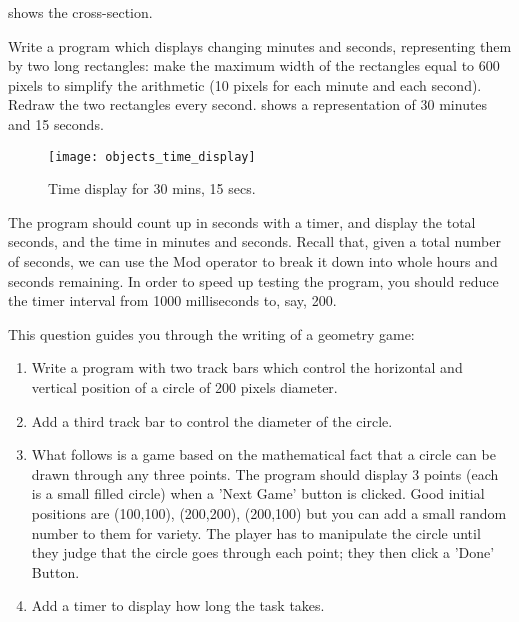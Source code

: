 \begin{EXE}
				 shows the cross-section.
			\item Write a program which displays changing minutes and seconds, representing them by two long rectangles: make the maximum width of the rectangles equal to 600 pixels to simplify the arithmetic (10 pixels for each minute and each second). Redraw the two rectangles every second.  shows a representation of 30 minutes and 15 seconds.
				\begin{figure}[ht]
					\centering
					\texttt{[image: objects\_time\_display]}
					\caption{Time display for 30 mins, 15 secs.}
					\label{fig:objects_time_display}
				\end{figure}

				
				The program should count up in seconds with a timer, and display the total seconds, and the time in minutes and seconds. Recall that, given a total number of seconds, we can use the Mod operator to break it down into whole hours and seconds remaining. In order to speed up testing the program, you should reduce the timer interval from 1000 milliseconds to, say, 200.
			\item This question guides you through the writing of a geometry game:
				\begin{enumerate}[label=(\alph*)]
					\item	Write a program with two track bars which control the horizontal and vertical position of a circle of 200 pixels diameter.
					\item Add a third track bar to control the diameter of the circle.
					\item What follows is a game based on the mathematical fact that a circle can be drawn through any three points. The program should display 3 points (each is a small filled circle) when a 'Next Game' button is clicked. Good initial positions are (100,100), (200,200), (200,100) but you can add a small random number to them for variety. The player has to manipulate the circle until they judge that 
the circle goes through each point; they then click a 'Done' Button.
					\item	Add a timer to display how long the task takes.
				\end{enumerate}
		\end{EXE}


